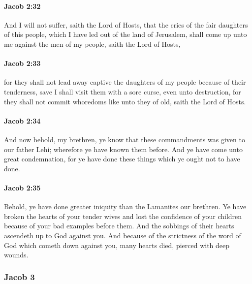 		\paragraph{Jacob 2:32} %
			\label{JACOB-2-32}

			And I will not suffer, saith the Lord of Hosts,
			that the cries of the fair daughters of this people,
			which I have led out of the land of Jerusalem,
			shall come up unto me against the men of my people, saith the Lord of Hosts,

		\paragraph{Jacob 2:33} %
			\label{JACOB-2-33}

			for they shall not lead away captive the daughters of my people
			because of their tenderness,
			save I shall visit them with a sore curse, even unto destruction,
			for they shall not commit whoredoms
			like unto they of old, saith the Lord of Hosts.

		\paragraph{Jacob 2:34} %
			\label{JACOB-2-34}

			And now behold, my brethren, ye know
			that these commandments was given to our father Lehi;
			wherefore ye have known them before.
			And ye have come unto great condemnation,
			for ye have done these things which ye ought not to have done.

		\paragraph{Jacob 2:35} %
			\label{JACOB-2-35}

			Behold, ye have done greater iniquity than the Lamanites our brethren.
			Ye have broken the hearts of your tender wives
			and lost the confidence of your children
			because of your bad examples before them.
			And the sobbings of their hearts ascendeth up to God against you.
			And because of the strictness of the word of God
			which cometh down against you,
			many hearts died, pierced with deep wounds.

	\subsubsection{Jacob 3} %
		\label{JACOB-3}
		

